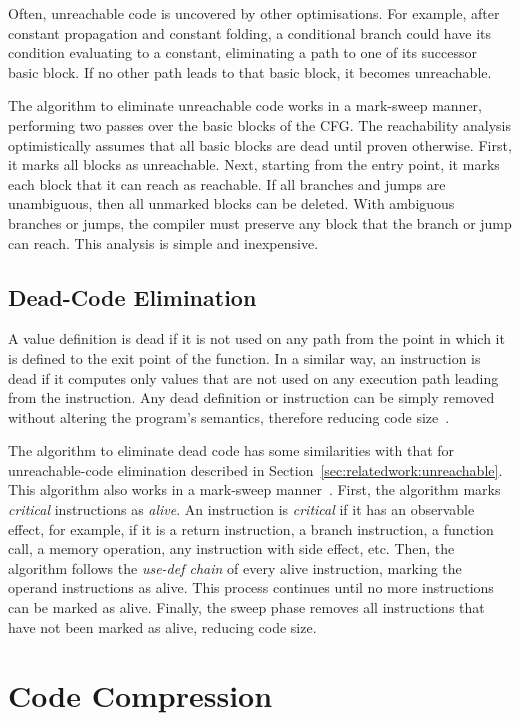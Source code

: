 Often, unreachable code is uncovered by other optimisations.
For example, after constant propagation and constant folding, a conditional branch could have its condition evaluating to a constant, eliminating a path to one of its successor basic block.
If no other path leads to that basic block, it becomes unreachable.

The algorithm to eliminate unreachable code works in a mark-sweep manner, performing two passes over the basic blocks of the CFG.
The reachability analysis optimistically assumes that all basic blocks are dead until proven otherwise.
First, it marks all blocks as unreachable.
Next, starting from the entry point, it marks each block that it can reach as reachable.
If all branches and jumps are unambiguous, then all unmarked blocks can be deleted.
With ambiguous branches or jumps, the compiler must preserve any block that the branch or jump can reach.
This analysis is simple and inexpensive.

\subsection{Dead-Code Elimination} \label{sec:relatedwork:dce}

A value definition is dead if it is not used on any path from the point in which it is defined to the exit point of the function.
In a similar way, an instruction is dead if it computes only values that are not used on any execution path leading from the instruction.
Any dead definition or instruction can be simply removed without altering the program's semantics, therefore reducing code size~\cite{muchnick98}.

The algorithm to eliminate dead code has some similarities with that for unreachable-code elimination described in Section~\ref{sec:relatedwork:unreachable}.
This algorithm also works in a mark-sweep manner~\cite{cooper07}.
First, the algorithm marks \textit{critical} instructions as \textit{alive}.
An instruction is \textit{critical} if it has an observable effect, for example, if it is a return instruction, a branch instruction, a function call, a memory operation, any instruction with side effect, etc.
Then, the algorithm follows the \textit{use-def chain} of every alive instruction, marking the operand instructions as alive.
This process continues until no more instructions can be marked as alive.
Finally, the sweep phase removes all instructions that have not been marked as alive, reducing code size.

\section{Code Compression}

